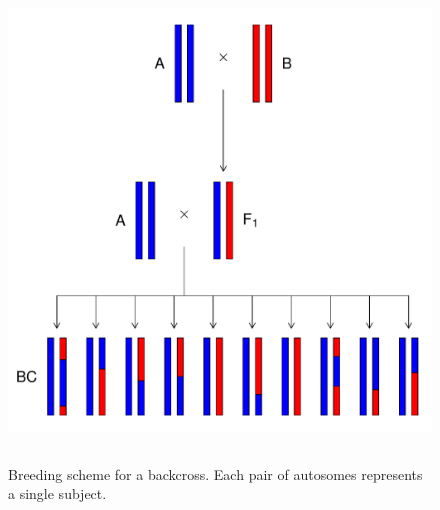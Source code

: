 \documentclass[oneside]{book}\usepackage[]{graphicx}\usepackage[]{color}
\makeatletter
\def\maxwidth{ %
  \ifdim\Gin@nat@width>\linewidth
    \linewidth
  \else
    \Gin@nat@width
  \fi
}
\newenvironment{knitrout}{}{} %
\makeatother
\begin{document}
\begin{knitrout}
\color{fgcolor}\begin{figure}
\includegraphics[width=\maxwidth,height=5in]{figure/backcross-1} \caption[Breeding scheme for a backcross]{Breeding scheme for a backcross. Each pair of autosomes represents a single subject.}\label{fig:backcross}
\end{figure}


\end{knitrout}
\end{document}

